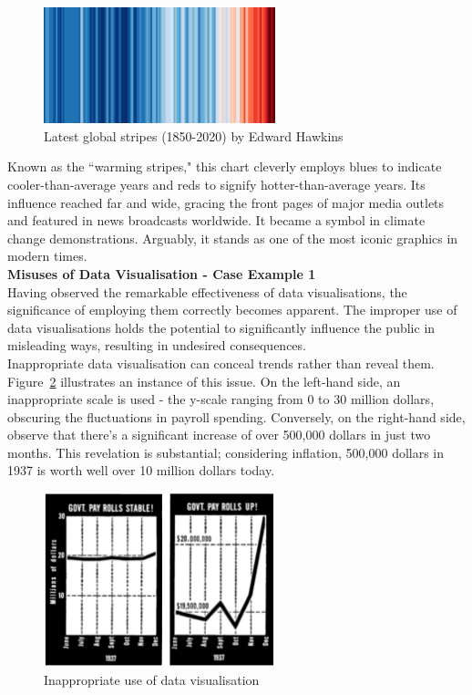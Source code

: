 \documentclass{article}\usepackage[]{graphicx}\usepackage[]{xcolor}
\begin{document}
\begin{figure}[H]
    \centering
    \includegraphics[width=0.6\textwidth]{image_reference/global.png}
    \caption{Latest global stripes (1850-2020) by Edward Hawkins\cite{blog}}
    \label{fig:global}
\end{figure}

\noindent 
Known as the ``warming stripes," this chart cleverly employs blues to indicate cooler-than-average years and reds to signify hotter-than-average years. Its influence reached far and wide, gracing the front pages of major media outlets and featured in news broadcasts worldwide. It became a symbol in climate change demonstrations. Arguably, it stands as one of the most iconic graphics in modern times.\\

\noindent
\textbf{Misuses of Data Visualisation - Case Example 1}\\

\noindent
Having observed the remarkable effectiveness of data visualisations, the significance of employing them correctly becomes apparent. The improper use of data visualisations holds the potential to significantly influence the public in misleading ways, resulting in undesired consequences.\\

\noindent
Inappropriate data visualisation can conceal trends rather than reveal them. Figure~\ref{fig:misuse1} illustrates an instance of this issue. On the left-hand side, an inappropriate scale is used - the y-scale ranging from 0 to 30 million dollars, obscuring the fluctuations in payroll spending. Conversely, on the right-hand side, observe that there's a significant increase of over 500,000 dollars in just two months. This revelation is substantial; considering inflation, 500,000 dollars in 1937 is worth well over 10 million dollars today\cite{worth}.

\begin{figure}[H]
    \centering
    \includegraphics[width=0.6\textwidth]{image_reference/misuse1.png}
    \caption{Inappropriate use of data visualisation\cite{lie}}
    \label{fig:misuse1}
\end{figure}
\end{document}
